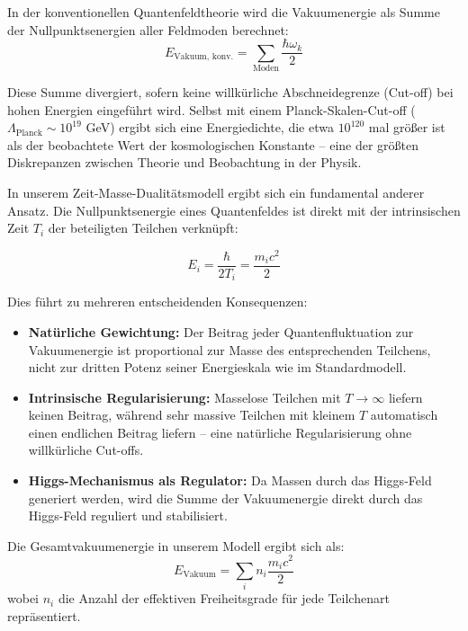 \documentclass[a4paper,12pt]{article}
\begin{document}
	In der konventionellen Quantenfeldtheorie wird die Vakuumenergie als Summe der Nullpunktsenergien aller Feldmoden berechnet:
	\begin{equation}
		E_{\text{Vakuum, konv.}} = \sum_{\text{Moden}} \frac{\hbar\omega_k}{2}
	\end{equation}
	
	Diese Summe divergiert, sofern keine willkürliche Abschneidegrenze (Cut-off) bei hohen Energien eingeführt wird. Selbst mit einem Planck-Skalen-Cut-off ($\Lambda_{\text{Planck}} \sim 10^{19}$ GeV) ergibt sich eine Energiedichte, die etwa $10^{120}$ mal größer ist als der beobachtete Wert der kosmologischen Konstante – eine der größten Diskrepanzen zwischen Theorie und Beobachtung in der Physik.
	
	In unserem Zeit-Masse-Dualitätsmodell ergibt sich ein fundamental anderer Ansatz. Die Nullpunktsenergie eines Quantenfeldes ist direkt mit der intrinsischen Zeit $T_i$ der beteiligten Teilchen verknüpft:
	
	\begin{equation}
		E_i = \frac{\hbar}{2T_i} = \frac{m_i c^2}{2}
	\end{equation}
	
	Dies führt zu mehreren entscheidenden Konsequenzen:
	
	\begin{itemize}
		\item \textbf{Natürliche Gewichtung:} Der Beitrag jeder Quantenfluktuation zur Vakuumenergie ist proportional zur Masse des entsprechenden Teilchens, nicht zur dritten Potenz seiner Energieskala wie im Standardmodell.
		
		\item \textbf{Intrinsische Regularisierung:} Masselose Teilchen mit $T \to \infty$ liefern keinen Beitrag, während sehr massive Teilchen mit kleinem $T$ automatisch einen endlichen Beitrag liefern – eine natürliche Regularisierung ohne willkürliche Cut-offs.
		
		\item \textbf{Higgs-Mechanismus als Regulator:} Da Massen durch das Higgs-Feld generiert werden, wird die Summe der Vakuumenergie direkt durch das Higgs-Feld reguliert und stabilisiert.
	\end{itemize}
	
	Die Gesamtvakuumenergie in unserem Modell ergibt sich als:
	\begin{equation}
		E_{\text{Vakuum}} = \sum_i n_i \frac{m_i c^2}{2}
	\end{equation}
	wobei $n_i$ die Anzahl der effektiven Freiheitsgrade für jede Teilchenart repräsentiert.
	
\end{document}
